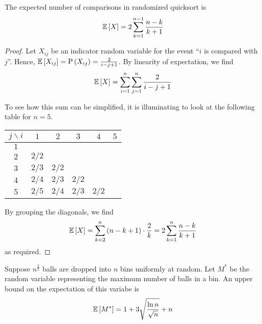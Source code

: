 \documentclass[11pt]{article}
\begin{document}
\begin{prop}
    The expected number of comparisons in randomized quicksort is
    \begin{equation*}
        \operatorname{\mathbb{E}}{\left[X\right]} = 2 \sum_{k=1}^{n-1} { \frac{n-k}{k+1} }
    \end{equation*}
\end{prop}

\begin{proof}
    Let $X_{ij}$ be an indicator random variable for the event
    ``$i$ is compared with $j$''.
    Hence, $\operatorname{\mathbb{E}}{\left[X_{ij}\right]} = \operatorname{P}{\left(X_{ij}\right)} = \frac{2}{i - j + 1}$.
    By linearity of expectation, we find
    \begin{equation*}
        \operatorname{\mathbb{E}}{\left[X\right]} = \sum_{i=1}^n \sum_{j=1}^n \frac{2}{i - j + 1}
    \end{equation*}

    To see how this sum can be simplified, it is illuminating to look at the
    following table for $n = 5$.

    \begin{center}
        \begin{tabular}{c | c c c c c}
            $j\backslash i$ & $1$ & $2$ & $3$ & $4$ & $5$ \\ \hline
            $1$ & & & & & \\
            $2$ & $2/2$ & & & & \\
            $3$ & $2/3$ & $2/2$ & & & \\
            $4$ & $2/4$ & $2/3$ & $2/2$ & & \\
            $5$ & $2/5$ & $2/4$ & $2/3$ & $2/2$ & \\
        \end{tabular}
    \end{center}

    By grouping the diagonals, we find
    \begin{equation*}
        \operatorname{\mathbb{E}}{\left[X\right]}
        = \sum_{k=2}^n {
            (n-k+1) \cdot \frac{2}{k}
        }
        = 2 \sum_{k=1}^n {
            \frac{n-k}{k+1}
        }
    \end{equation*}
    as required.
\end{proof}


\begin{prop}
    Suppose $n^{\frac{3}{2}}$ balls are dropped into $n$ bins uniformly at
    random.
    Let $M^*$ be the random variable representing the maximum number of balls
    in a bin.
    An upper bound on the expectation of this variabe is
    \begin{equation*}
        \operatorname{\mathbb{E}}{\left[M^*\right]} = 1 + 3 \sqrt{\frac{\ln n}{\sqrt n}} + n
    \end{equation*}
\end{prop}
\end{document}
